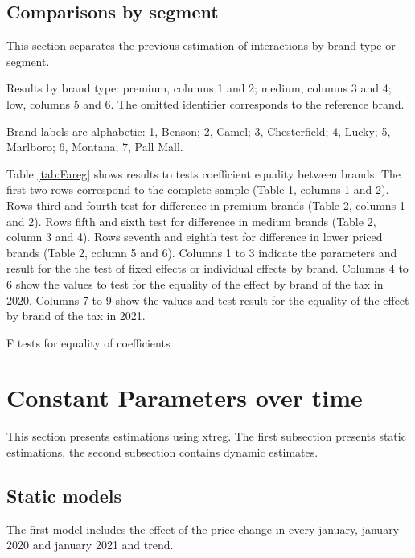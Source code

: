 \documentclass[]{article}
\begin{document}
\subsection{Comparisons by segment}
This section separates the previous estimation of interactions by brand type or segment.

Results by brand type: premium, columns 1 and 2; medium, columns 3 and 4; low, columns 5 and 6.
The omitted identifier corresponds to the reference brand.

	
%

Brand labels are alphabetic: 1, Benson; 2, Camel; 3, Chesterfield; 4, Lucky; 5, Marlboro; 6, Montana; 7, Pall Mall.

Table \ref{tab:Fareg} shows results to tests coefficient equality between brands. The first two rows correspond to the complete sample (Table 1, columns 1 and 2). Rows third and fourth test for difference in premium brands (Table 2, columns 1 and 2). Rows fifth and sixth test for difference in medium brands (Table 2, column 3 and 4). Rows seventh and eighth test for difference in lower priced brands (Table 2, column 5 and 6). Columns 1 to 3 indicate the parameters and result for the the test of fixed effects or individual effects by brand. Columns 4 to 6 show the values to test for the equality of the effect by brand of the tax in 2020. Columns 7 to 9 show the values and test result for the equality of the effect by brand of the tax in 2021.


\begin{landscape}
	\begin{table}[ht]
		\centering
		\caption{F tests for equality of coefficients \label{tab:Fareg}} 
	

	\end{table}
\end{landscape}

\section{Constant Parameters over time}
This section presents estimations using xtreg. The first subsection presents static estimations, the second subsection contains dynamic estimates.

\subsection{Static models}
The first model includes the effect of the price change in every january, january 2020 and january 2021 and trend.
\end{document}
